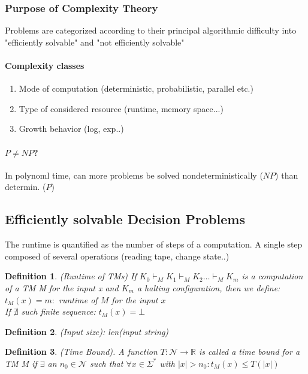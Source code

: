 \documentclass[a3paper, 8pt]{extarticle}
\newtheorem*{definition}{Definition}
\begin{document}
\begin{multicols*}{6}
\subsubsection{Purpose of Complexity Theory}
Problems are categorized according to their principal algorithmic difficulty into "efficiently solvable" and "not efficiently solvable"

\paragraph{Complexity classes}
\begin{enumerate}
    \item Mode of computation (deterministic, probabilistic, parallel etc.)
    \item Type of considered resource (runtime, memory space...)
    \item Growth behavior (log, exp..)
\end{enumerate}

\paragraph{$P \neq NP$?}
In polynoml time, can more problems be solved nondeterministically (\textbf{$NP$}) than determin. (\textbf{$P$})

\subsection{Efficiently solvable Decision Problems}

The runtime is quantified as the number of steps of a computation. A single step composed of several operations (reading tape, change state..)

\begin{definition}
    (Runtime of TMs) If $K_0 \vdash_M K_1 \vdash_M K_2 \dots \vdash_M K_m $ is a computation of a TM M for the input x and $K_m$ a halting configuration, then we define:\\ 
        $t_M(x)=m:$ runtime of $M$ for the input $x$\\
        If $\nexists$ such finite sequence: $t_M(x)=\bot$

\end{definition}


\begin{definition}
    (Input size): len(input string)
\end{definition}

\begin{definition}
    (Time Bound). A function $T: \mathcal{N}\to \mathbb{R}$ is called a time bound for a TM M if $\exists$ an $n_0 \in \mathcal{N}$ such that $\forall x \in \Sigma^*$ with $|x|>n_0:t_M(x)\leq T(|x|)$
\end{definition}


\end{multicols*}
\end{document}

